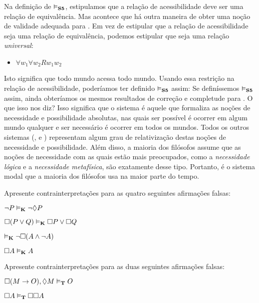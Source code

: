 Na definição de  $\vDash_{\mathbf{S5}} $, estipulamos que a relação de acessibilidade deve ser uma relação de equivalência. Mas acontece que há outra maneira de obter uma noção de validade adequada para \mlSfive. Em vez de estipular que a relação de acessibilidade seja uma relação de equivalência, podemos estipular que seja uma relação \emph{universal}:
\begin{itemize}
	\item $\forall w_1\forall w_2Rw_1w_2$
\end{itemize}
Isto significa  que todo mundo acessa todo mundo. Usando essa restrição na relação de acessibilidade, poderíamos ter definido  $\vDash_{\mathbf{S5}} $ assim:
Se definíssemos $\vDash_{\mathbf{S5}} $ assim, ainda obteríamos os mesmos resultados de correção e completude para \mlSfive{}. O que isso nos diz? Isso significa que o sistema \mlSfive{} é aquele que formaliza as noções de necessidade e possibilidade absolutas, nas quais ser possível é ocorrer em algum mundo qualquer e ser necessário é ocorrer em todos os mundos. Todos os outros sistemas (\mlK{}, \mlT{} e \mlSfour) representam algum grau de relativização destas noções de necessidade e possibilidade.
 Além disso, a maioria dos filósofos assume que as noções de necessidade com as quais estão mais preocupados, como a  \emph{necessidade lógica} e a \emph{necessidade metafísica}, são exatamente desse tipo. Portanto, \mlSfive{} é o sistema modal que a maioria dos filósofos usa na maior parte do tempo.
 

\practiceproblems

\problempart
Apresente contrainterpretações para as quatro seguintes afirmações falsas:
\begin{earg}
	\item $\neg P \vDash_{\mathbf{K}} \neg\Diamond P$
	\item $\Box(P \vee Q)\vDash_{\mathbf{K}} \Box P \vee \Box Q$
	\item $\vDash_{\mathbf{K}} \neg \Box (A\wedge \neg A)$
	\item $\Box A\vDash_{\mathbf{K}} A$
\end{earg}

\problempart
Apresente contrainterpretações para as duas seguintes afirmações falsas:
\begin{earg}
	\item $\Box (M\rightarrow O),\Diamond M\vDash_{\mathbf{T}} O$
	\item $\Box A\vDash_{\mathbf{T}} \Box \Box A$
\end{earg}

